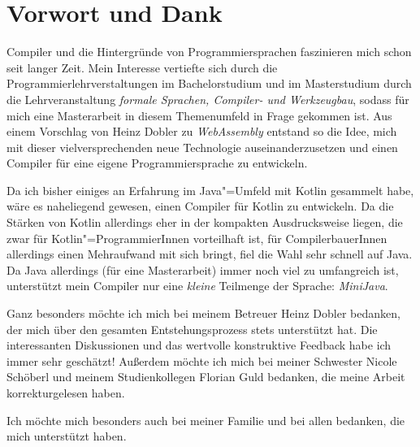 \chapter{Vorwort und Dank}
 
Compiler und die Hintergründe von Programmiersprachen faszinieren mich schon seit langer Zeit. Mein Interesse vertiefte sich durch die Programmierlehrverstaltungen im Bachelorstudium und im Masterstudium durch die Lehrveranstaltung \emph{formale Sprachen, Compiler- und Werkzeugbau}, sodass für mich eine Masterarbeit in diesem Themenumfeld in Frage gekommen ist. Aus einem Vorschlag von Heinz Dobler zu \emph{WebAssembly} entstand so die Idee, mich mit dieser vielversprechenden neue Technologie auseinanderzusetzen und einen Compiler für eine eigene Programmiersprache zu entwickeln.

Da ich bisher einiges an Erfahrung im Java"=Umfeld mit Kotlin gesammelt habe, wäre es naheliegend gewesen, einen Compiler für Kotlin zu entwickeln. Da die Stärken von Kotlin allerdings eher in der kompakten Ausdrucksweise liegen, die zwar für Kotlin"=ProgrammierInnen vorteilhaft ist, für CompilerbauerInnen allerdings einen Mehraufwand mit sich bringt, fiel die Wahl sehr schnell auf Java. Da Java allerdings (für eine Masterarbeit) immer noch viel zu umfangreich ist, unterstützt mein Compiler nur eine \emph{kleine} Teilmenge der Sprache: \emph{MiniJava}.

Ganz besonders möchte ich mich bei meinem Betreuer Heinz Dobler bedanken, der mich über den gesamten Entstehungsprozess stets unterstützt hat. Die interessanten Diskussionen und das wertvolle konstruktive Feedback habe ich immer sehr geschätzt! Außerdem möchte ich mich bei meiner Schwester Nicole Schöberl und meinem Studienkollegen Florian Guld bedanken, die meine Arbeit korrekturgelesen haben.

Ich möchte mich besonders auch bei meiner Familie und bei allen bedanken, die mich unterstützt haben.

